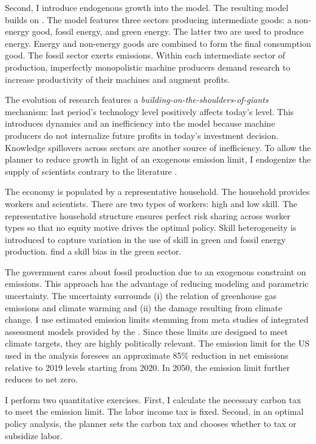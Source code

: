 Second, I introduce endogenous growth into the model. The resulting model builds on \cite{Fried2018ClimateAnalysis}. The model features three sectors producing intermediate goods:  a non-energy good, fossil energy, and green energy. The latter two are used to produce energy. Energy and non-energy goods are combined to form the final consumption good. The fossil sector exerts emissions. Within each intermediate sector of production, imperfectly monopolistic machine producers demand research to increase productivity of their machines and augment profits.

The evolution of research features a \textit{building-on-the-shoulders-of-giants} mechanism: last period's technology level positively affects today's level. This introduces dynamics and an inefficiency into the model because machine producers do not internalize future profits in today's investment decision. Knowledge spillovers across sectors are another source of inefficiency. To allow the planner to reduce growth in light of an exogenous emission limit, I endogenize the supply of scientists contrary to the literature \citep{Acemoglu2012TheChange, Fried2018ClimateAnalysis}. 

The economy is populated by a representative household. The household provides workers and scientists. There are two types of workers: high and low skill. The representative household structure ensures perfect risk sharing across worker types so that no equity motive drives the optimal policy. 
Skill heterogeneity is introduced to capture variation in the use of skill in green and fossil energy production. \cite{Consoli2016DoCapital} find a skill bias in the green sector. 

The government cares about fossil production due to an exogenous constraint on emissions. This approach has the advantage of reducing modeling and parametric uncertainty. The uncertainty surrounds (i) the relation of greenhouse gas emissions and climate warming and (ii) the damage resulting from climate change. I use estimated emission limits stemming from meta studies of integrated assessment models provided by the \cite{IPCC2022}. Since these limits are designed to meet climate targets, they are highly politically relevant.  
The emission limit for the US used in the analysis foresees an approximate 85\% reduction in net emissions relative to 2019 levels starting from 2020. In 2050, the emission limit further reduces to net zero. 

I perform two quantitative exercises. First, I calculate the necessary carbon tax to meet the emission limit. The labor income tax is fixed. Second, in an optimal policy analysis, the planner sets the carbon tax and chooses whether to tax or subsidize labor.


